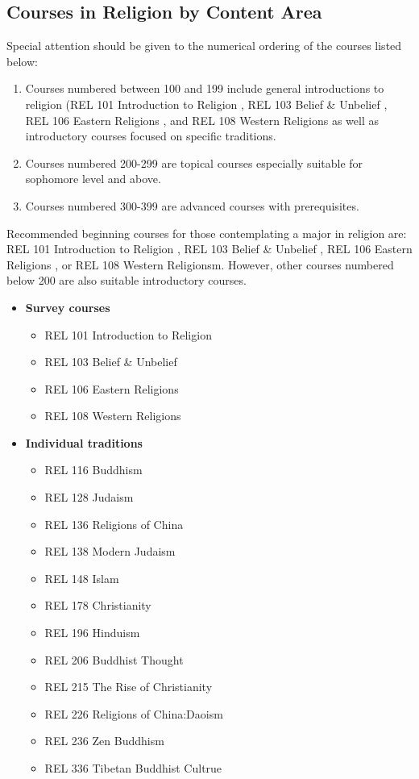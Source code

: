 \documentclass[
  letterpaper,
]{scrbook}
\providecommand{\tightlist}{%
  \setlength{\itemsep}{0pt}\setlength{\parskip}{0pt}}
\begin{document}
\subsection{Courses in Religion by Content
Area}\label{courses-in-religion-by-content-area}

Special attention should be given to the numerical ordering of the
courses listed below:

\begin{enumerate}
\def\labelenumi{\arabic{enumi}.}
\item
  Courses numbered between 100 and 199 include general introductions to
  religion (REL 101 Introduction to Religion , REL 103 Belief \&
  Unbelief , REL 106 Eastern Religions , and REL 108 Western Religions
  as well as introductory courses focused on specific traditions.
\item
  Courses numbered 200-299 are topical courses especially suitable for
  sophomore level and above.
\item
  Courses numbered 300-399 are advanced courses with prerequisites.
\end{enumerate}

Recommended beginning courses for those contemplating a major in
religion are: REL 101 Introduction to Religion , REL 103 Belief \&
Unbelief , REL 106 Eastern Religions , or REL 108 Western Religionsm.
However, other courses numbered below 200 are also suitable introductory
courses.

\begin{itemize}
\tightlist
\item
  \textbf{Survey courses}

  \begin{itemize}
  \tightlist
  \item
    REL 101 Introduction to Religion
  \item
    REL 103 Belief \& Unbelief
  \item
    REL 106 Eastern Religions
  \item
    REL 108 Western Religions
  \end{itemize}
\item
  \textbf{Individual traditions}

  \begin{itemize}
  \tightlist
  \item
    REL 116 Buddhism
  \item
    REL 128 Judaism
  \item
    REL 136 Religions of China
  \item
    REL 138 Modern Judaism
  \item
    REL 148 Islam
  \item
    REL 178 Christianity
  \item
    REL 196 Hinduism
  \item
    REL 206 Buddhist Thought
  \item
    REL 215 The Rise of Christianity
  \item
    REL 226 Religions of China:Daoism
  \item
    REL 236 Zen Buddhism
  \item
    REL 336 Tibetan Buddhist Cultrue
  \end{itemize}
\end{itemize}
\end{document}
